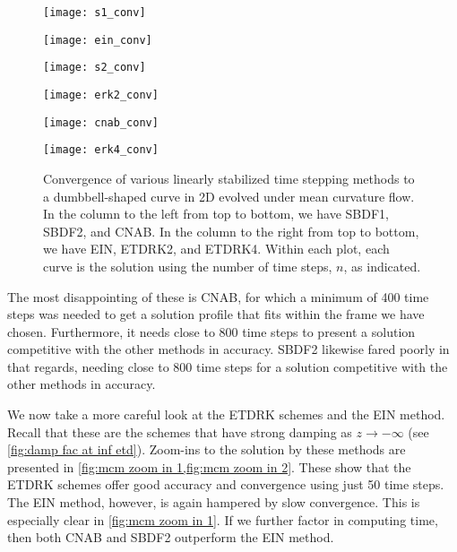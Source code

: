 \begin{figure}[htb!]
        \centering
\begin{minipage}{0.48\textwidth}
        \texttt{[image: s1\_conv]}
\end{minipage}
\begin{minipage}{0.48\textwidth}
        \texttt{[image: ein\_conv]}
\end{minipage}
\begin{minipage}{0.48\textwidth}
        \texttt{[image: s2\_conv]}
\end{minipage}
\begin{minipage}{0.48\textwidth}
        \texttt{[image: erk2\_conv]}
\end{minipage}
\begin{minipage}{0.48\textwidth}
        \texttt{[image: cnab\_conv]}
\end{minipage}
\begin{minipage}{0.48\textwidth}
        \texttt{[image: erk4\_conv]}
\end{minipage}
\caption[Convergence of linearly stabilized schemes to a dumbbell-shaped curve evolved under mean curvature flow]{Convergence of various linearly stabilized time stepping methods to a dumbbell-shaped curve in 2D evolved under mean curvature flow. In the column to the left from top to bottom, we have SBDF1, SBDF2, and CNAB. In the column to the right from top to bottom, we have EIN, ETDRK2, and ETDRK4. Within each plot, each curve is the solution using the number of time steps, $n$, as indicated.}
\label{fig:mcm 2d conv}
\end{figure}

The most disappointing of these is CNAB, for which a minimum of 400 time steps was needed to get a solution profile that fits within the frame we have chosen. Furthermore, it needs close to 800 time steps to present a solution competitive with the other methods in accuracy. SBDF2 likewise fared poorly in that regards, needing close to 800 time steps for a solution competitive with the other methods in accuracy. 

We now take a more careful look at the ETDRK schemes and the EIN method. Recall that these are the schemes that have strong damping as $z\to-\infty$ (see \cref{fig:damp fac at inf etd}). Zoom-ins to the solution by these methods are presented in \cref{fig:mcm zoom in 1,fig:mcm zoom in 2}. These show that the ETDRK schemes offer good accuracy and convergence using just 50 time steps. The EIN method, however, is again hampered by slow convergence. This is especially clear in \cref{fig:mcm zoom in 1}. If we further factor in computing time, then both CNAB and SBDF2 outperform the EIN method.

